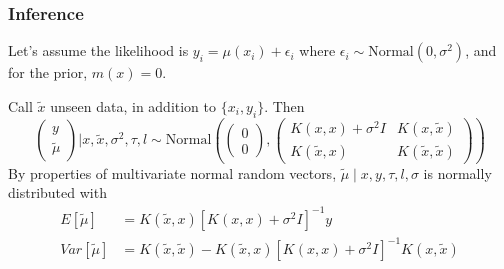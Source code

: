 \documentclass{beamer}
\begin{document}
\begin{frame}
\frametitle{Inference}


Let's assume the likelihood is $y_i = \mu(x_i) + \epsilon_i$ where $\epsilon_i \sim \text{Normal}(0,\sigma^2)$, and for the prior, $m(x) = 0$. 
\newline

Call $\tilde{x}$ unseen data, in addition to $\{x_i,y_i\}$. Then
$$
\left(\begin{array}{c}
y \\
\tilde{\mu}
\end{array}\right) 
\bigg\rvert x, \tilde{x}, \sigma^2, \tau, l
\sim \text{Normal}\left(
\left(\begin{array}{c}
0\\
0
\end{array}\right),
\left(\begin{array}{cc}
K(x,x) + \sigma^2 I & K(x,\tilde{x})\\
K(\tilde{x}, x) & K(\tilde{x}, \tilde{x})
\end{array}\right)
\right)
$$
By properties of multivariate normal random vectors, $\tilde{\mu} \mid x, y, \tau, l, \sigma$ is normally distributed with
\begin{align*}
E[\tilde{\mu}] &= K(\tilde{x}, x) [K(x,x) + \sigma^2 I]^{-1} y \\
Var[\tilde{\mu}] &= K(\tilde{x}, \tilde{x}) - K(\tilde{x}, x)[K(x,x) + \sigma^2 I]^{-1} K(x,\tilde{x})
\end{align*}

\end{frame}
\end{document}
